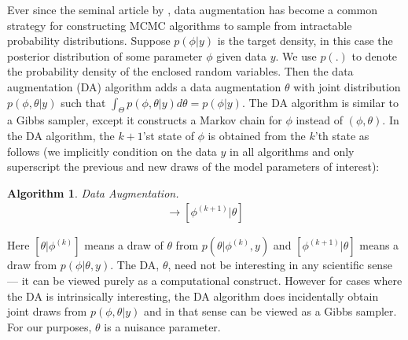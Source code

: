 \documentclass{article}
\newtheorem{alg}{Algorithm}
\begin{document}
Ever since the seminal article by , data augmentation has become a common strategy for constructing MCMC algorithms to sample from intractable probability distributions. Suppose $p(\phi|y)$ is the target density, in this case the posterior distribution of some parameter $\phi$ given data $y$. We use $p(.)$ to denote the probability density of the enclosed random variables. Then the data augmentation (DA) algorithm adds a data augmentation $\theta$ with joint distribution $p(\phi,\theta|y)$ such that $\int_{\Theta}p(\phi,\theta|y)d\theta = p(\phi|y)$. The DA algorithm is similar to a Gibbs sampler, except it constructs a Markov chain for $\phi$ instead of $(\phi, \theta)$. In the DA algorithm, the $k+1$'st state of $\phi$ is obtained from the $k$'th state as follows (we implicitly condition on the data $y$ in all algorithms and only superscript the previous and new draws of the model parameters of interest):
\begin{alg}Data Augmentation.\label{alg:DA}
  \begin{align*}
  [\theta|\phi^{(k)}] \to [\phi^{(k+1)}|\theta]
\end{align*}
\end{alg} 
\noindent Here $[\theta|\phi^{(k)}]$ means a draw of $\theta$ from $p(\theta|\phi^{(k)},y)$ and $[\phi^{(k+1)}|\theta]$ means a draw from $p(\phi|\theta,y)$. The DA, $\theta$, need not be interesting in any scientific sense --- it can be viewed purely as a computational construct. However for cases where the DA is intrinsically interesting, the DA algorithm does incidentally obtain joint draws from $p(\phi,\theta|y)$ and in that sense can be viewed as a Gibbs sampler. For our purposes, $\theta$ is a nuisance parameter.
\end{document}
